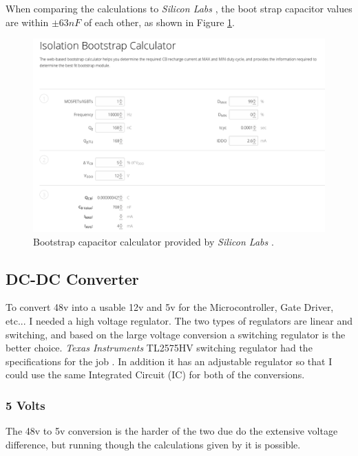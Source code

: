\documentclass{article}
\begin{document}
		\noindent When comparing the calculations to \textit{Silicon Labs} \cite{silabs}, the boot strap capacitor values are within $\pm 63nF$ of each other, as shown in Figure \ref{fig:silabsCalc}.
	
		\begin{figure}[!h]
			\begin{center}
				\includegraphics[scale=0.3]{silabs_bootstrap_cap}
			\end{center}
			\caption{Bootstrap capacitor calculator provided by \textit{Silicon Labs} \cite{silabs}.}
			\label{fig:silabsCalc}
		\end{figure}
	
		\subsection{DC-DC Converter}
		To convert 48v into a usable 12v and 5v for the Microcontroller, Gate Driver, etc... I needed a high voltage regulator.  The two types of regulators are linear and switching, and based on the large voltage conversion a switching regulator is the better choice.  \textit{Texas Instruments} TL2575HV switching regulator had the specifications for the job \cite{buck converter}.  In addition it has an adjustable regulator so that I could use the same Integrated Circuit (IC) for both of the conversions.
	
		\subsubsection{5 Volts}
		The 48v to 5v conversion is the harder of the two due do the extensive voltage difference, but running though the calculations given by \cite{buck converter} it is possible.
		
\end{document}
